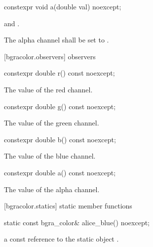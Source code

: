 \begin{itemdecl}
constexpr void a(double val) noexcept;
\end{itemdecl}
\begin{itemdescr}
\pnum
\requires
{} and .

\pnum
\effects
{}

\pnum
{}

\pnum
{}

\pnum
The alpha channel shall be set to .
\end{itemdescr}

 [bgracolor.observers]{ observers}

\begin{itemdecl}
constexpr double r() const noexcept;
\end{itemdecl}
\begin{itemdescr}
\pnum
\returns
The value of the red channel.
\end{itemdescr}

\begin{itemdecl}
constexpr double g() const noexcept;
\end{itemdecl}
\begin{itemdescr}
\pnum
\returns
The value of the green channel.
\end{itemdescr}

\begin{itemdecl}
constexpr double b() const noexcept;
\end{itemdecl}
\begin{itemdescr}
\pnum
\returns
The value of the blue channel.
\end{itemdescr}

\begin{itemdecl}
constexpr double a() const noexcept;
\end{itemdecl}
\begin{itemdescr}
\pnum
\returns
The value of the alpha channel.
\end{itemdescr}

 [bgracolor.statics] { static member functions}

\begin{itemdecl}
static const bgra_color& alice_blue() noexcept;
\end{itemdecl}
\begin{itemdescr}
\pnum
\returns
a const reference to the static  object .
\end{itemdescr}

